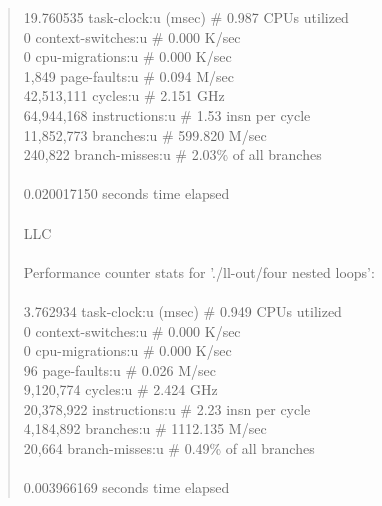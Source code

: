 \documentclass[12pt]{report}
\begin{document}
\begin{quote}
         19.760535      task-clock:u (msec)       \#    0.987 CPUs utilized           \\ 
                 0      context-switches:u        \#    0.000 K/sec                   \\ 
                 0      cpu-migrations:u          \#    0.000 K/sec                   \\ 
             1,849      page-faults:u             \#    0.094 M/sec                   \\ 
        42,513,111      cycles:u                  \#    2.151 GHz                     \\ 
        64,944,168      instructions:u            \#    1.53  insn per cycle          \\ 
        11,852,773      branches:u                \#  599.820 M/sec                   \\ 
           240,822      branch-misses:u           \#    2.03\% of all branches        \\ 
                                                                                      \\ 
       0.020017150 seconds time elapsed                                               \\ 
                                                                                      \\ 
LLC                                                                                     \\ 
                                                                                      \\ 
 Performance counter stats for './ll-out/four nested loops':                          \\ 
                                                                                      \\ 
          3.762934      task-clock:u (msec)       \#    0.949 CPUs utilized           \\ 
                 0      context-switches:u        \#    0.000 K/sec                   \\ 
                 0      cpu-migrations:u          \#    0.000 K/sec                   \\ 
                96      page-faults:u             \#    0.026 M/sec                   \\ 
         9,120,774      cycles:u                  \#    2.424 GHz                     \\ 
        20,378,922      instructions:u            \#    2.23  insn per cycle          \\ 
         4,184,892      branches:u                \# 1112.135 M/sec                   \\ 
            20,664      branch-misses:u           \#    0.49\% of all branches        \\ 
                                                                                      \\ 
       0.003966169 seconds time elapsed                                               \\ 
\end{quote}
\end{document}
